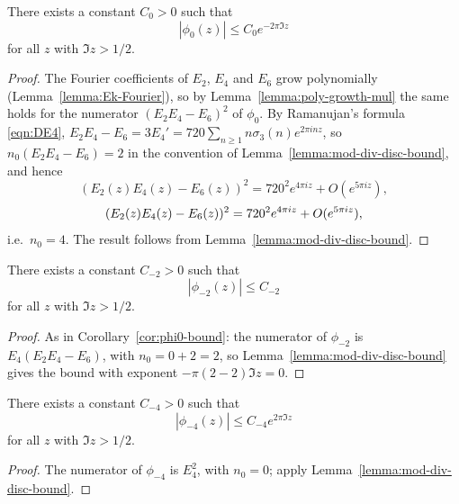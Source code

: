 \begin{corollary}\label{cor:phi0-bound}\leanok
There exists a constant $C_0 > 0$ such that
\begin{equation}\label{eqn:phi0-bound}
|\phi_0(z)| \le C_0 e^{-2 \pi \Im z}
\end{equation}
for all $z$ with $\Im z > 1/2$.
\end{corollary}
\begin{proof}
The Fourier coefficients of $E_2$, $E_4$ and $E_6$ grow polynomially (Lemma~\ref{lemma:Ek-Fourier}), so by Lemma~\ref{lemma:poly-growth-mul} the same holds for the numerator $(E_2E_4 - E_6)^2$ of $\phi_0$. By Ramanujan's formula \eqref{eqn:DE4}, $E_2 E_4 - E_6 = 3E_4' = 720 \sum_{n \ge 1} n \sigma_3(n) e^{2 \pi i n z}$, so $n_0(E_2E_4 - E_6) = 2$ in the convention of Lemma~\ref{lemma:mod-div-disc-bound}, and hence
\ifplastex
\begin{equation*}
    (E_2(z) E_4(z) - E_6(z))^{2} = 720^{2} e^{4 \pi i z} + O(e^{5 \pi i z}),
\end{equation*}
\else
\begin{equation}
    (E_2(z) E_4(z) - E_6(z))^{2} = 720^{2} e^{4 \pi i z} + O(e^{5 \pi i z}), \notag
\end{equation}
\fi
i.e.\ $n_0 = 4$. The result follows from Lemma~\ref{lemma:mod-div-disc-bound}.
\end{proof}

\begin{corollary}\label{cor:phi2-bound}
There exists a constant $C_{-2} > 0$ such that
\begin{equation}\label{eqn:phi2-bound}
    |\phi_{-2}(z)| \le C_{-2}
\end{equation}
for all $z$ with $\Im z > 1/2$.
\end{corollary}
\begin{proof}
As in Corollary~\ref{cor:phi0-bound}: the numerator of $\phi_{-2}$ is $E_4(E_2E_4 - E_6)$, with $n_0 = 0 + 2 = 2$, so Lemma~\ref{lemma:mod-div-disc-bound} gives the bound with exponent $-\pi(2-2)\Im z = 0$.
\end{proof}

\begin{corollary}\label{cor:phi4-bound}
There exists a constant $C_{-4} > 0$ such that
\begin{equation}\label{eqn:phi4-bound}
    |\phi_{-4}(z)| \le C_{-4} e^{2 \pi \Im z}
\end{equation}
for all $z$ with $\Im z > 1/2$.
\end{corollary}
\begin{proof}
The numerator of $\phi_{-4}$ is $E_4^2$, with $n_0 = 0$; apply Lemma~\ref{lemma:mod-div-disc-bound}.
\end{proof}

